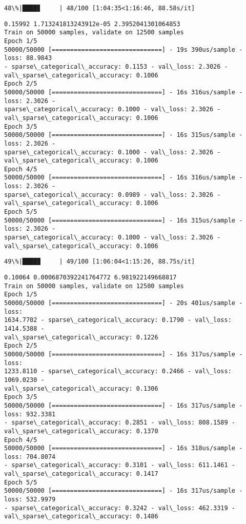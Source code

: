 \documentclass[11pt]{article}
\begin{document}
    \begin{Verbatim}[commandchars=\\\{\}]
 48\%|████▊     | 48/100 [1:04:35<1:16:46, 88.58s/it]
    \end{Verbatim}

    \begin{Verbatim}[commandchars=\\\{\}]
0.15992 1.713241813243912e-05 2.3952041301064853
Train on 50000 samples, validate on 12500 samples
Epoch 1/5
50000/50000 [==============================] - 19s 390us/sample - loss: 88.9843
- sparse\_categorical\_accuracy: 0.1153 - val\_loss: 2.3026 -
val\_sparse\_categorical\_accuracy: 0.1006
Epoch 2/5
50000/50000 [==============================] - 16s 316us/sample - loss: 2.3026 -
sparse\_categorical\_accuracy: 0.1000 - val\_loss: 2.3026 -
val\_sparse\_categorical\_accuracy: 0.1006
Epoch 3/5
50000/50000 [==============================] - 16s 315us/sample - loss: 2.3026 -
sparse\_categorical\_accuracy: 0.1000 - val\_loss: 2.3026 -
val\_sparse\_categorical\_accuracy: 0.1006
Epoch 4/5
50000/50000 [==============================] - 16s 316us/sample - loss: 2.3026 -
sparse\_categorical\_accuracy: 0.0989 - val\_loss: 2.3026 -
val\_sparse\_categorical\_accuracy: 0.1006
Epoch 5/5
50000/50000 [==============================] - 16s 315us/sample - loss: 2.3026 -
sparse\_categorical\_accuracy: 0.1000 - val\_loss: 2.3026 -
val\_sparse\_categorical\_accuracy: 0.1006
    \end{Verbatim}

    \begin{Verbatim}[commandchars=\\\{\}]
 49\%|████▉     | 49/100 [1:06:04<1:15:26, 88.75s/it]
    \end{Verbatim}

    \begin{Verbatim}[commandchars=\\\{\}]
0.10064 0.0006870392241764772 6.981922149668817
Train on 50000 samples, validate on 12500 samples
Epoch 1/5
50000/50000 [==============================] - 20s 401us/sample - loss:
1634.7702 - sparse\_categorical\_accuracy: 0.1790 - val\_loss: 1414.5388 -
val\_sparse\_categorical\_accuracy: 0.1226
Epoch 2/5
50000/50000 [==============================] - 16s 317us/sample - loss:
1233.8110 - sparse\_categorical\_accuracy: 0.2466 - val\_loss: 1069.0230 -
val\_sparse\_categorical\_accuracy: 0.1306
Epoch 3/5
50000/50000 [==============================] - 16s 317us/sample - loss: 932.3381
- sparse\_categorical\_accuracy: 0.2851 - val\_loss: 808.1589 -
val\_sparse\_categorical\_accuracy: 0.1370
Epoch 4/5
50000/50000 [==============================] - 16s 318us/sample - loss: 704.8074
- sparse\_categorical\_accuracy: 0.3101 - val\_loss: 611.1461 -
val\_sparse\_categorical\_accuracy: 0.1417
Epoch 5/5
50000/50000 [==============================] - 16s 317us/sample - loss: 532.9979
- sparse\_categorical\_accuracy: 0.3242 - val\_loss: 462.3319 -
val\_sparse\_categorical\_accuracy: 0.1486
    \end{Verbatim}
\end{document}
